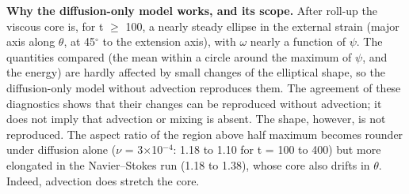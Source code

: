 \documentclass[11pt]{article}
\begin{document}
\textbf{Why the diffusion-only model works, and its scope.} After roll-up the viscous core is, for t $\ge{}$ 100, a nearly steady ellipse in the external strain (major axis along $\theta{}$, at 45$^\circ$ to the extension axis), with $\omega{}$ nearly a function of $\psi{}$. The quantities compared (the mean within a circle around the maximum of $\psi{}$, and the energy) are hardly affected by small changes of the elliptical shape, so the diffusion-only model without advection reproduces them. The agreement of these diagnostics shows that their changes can be reproduced without advection; it does not imply that advection or mixing is absent. The shape, however, is not reproduced. The aspect ratio of the region above half maximum becomes rounder under diffusion alone ($\nu{}$ = 3$\times{}$10$^{-4}$: 1.18 to 1.10 for t = 100 to 400) but more elongated in the Navier--Stokes run (1.18 to 1.38), whose core also drifts in $\theta{}$. Indeed, advection does stretch the core.
\end{document}
